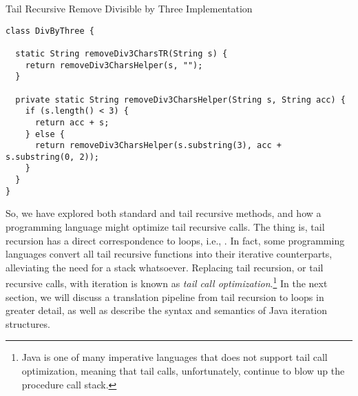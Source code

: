 \begin{cl}[]{Tail Recursive Remove Divisible by Three Implementation}
\begin{lstlisting}[language=MyJava]
class DivByThree {

  static String removeDiv3CharsTR(String s) {
    return removeDiv3CharsHelper(s, "");
  }

  private static String removeDiv3CharsHelper(String s, String acc) {
    if (s.length() < 3) {
      return acc + s;
    } else {
      return removeDiv3CharsHelper(s.substring(3), acc + s.substring(0, 2));
    }
  }
}
\end{lstlisting}
\end{cl}

So, we have explored both standard and tail recursive methods, and how a programming language might optimize tail recursive calls. The thing is, tail recursion has a direct correspondence to loops, i.e., . In fact, some programming languages convert all tail recursive functions into their iterative counterparts, alleviating the need for a stack whatsoever. Replacing tail recursion, or tail recursive calls, with iteration is known as \textit{tail call optimization}.\footnote{Java is one of many imperative languages that does not support tail call optimization, meaning that tail calls, unfortunately, continue to blow up the procedure call stack.} In the next section, we will discuss a translation pipeline from tail recursion to loops in greater detail, as well as describe the syntax and semantics of Java iteration structures.


